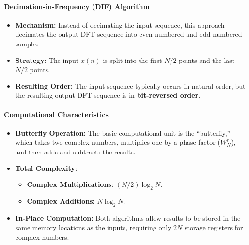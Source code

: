 \hypertarget{decimation-in-frequency-dif-algorithm}{%
\paragraph{Decimation-in-Frequency (DIF)
Algorithm}\label{decimation-in-frequency-dif-algorithm}}

\begin{itemize}
\tightlist
\item
  \textbf{Mechanism:} Instead of decimating the input sequence, this
  approach decimates the output DFT sequence into even-numbered and
  odd-numbered samples.
\item
  \textbf{Strategy:} The input \(x(n)\) is split into the first \(N/2\)
  points and the last \(N/2\) points.
\item
  \textbf{Resulting Order:} The input sequence typically occurs in
  natural order, but the resulting output DFT sequence is in
  \textbf{bit-reversed order}.
\end{itemize}

\hypertarget{computational-characteristics}{%
\paragraph{Computational
Characteristics}\label{computational-characteristics}}

\begin{itemize}
\tightlist
\item
  \textbf{Butterfly Operation:} The basic computational unit is the
  ``butterfly,'' which takes two complex numbers, multiplies one by a
  phase factor (\(W_N^r\)), and then adds and subtracts the results.
\item
  \textbf{Total Complexity:}

  \begin{itemize}
  \tightlist
  \item
    \textbf{Complex Multiplications:} \((N/2) \log_2 N\).
  \item
    \textbf{Complex Additions:} \(N \log_2 N\).
  \end{itemize}
\item
  \textbf{In-Place Computation:} Both algorithms allow results to be
  stored in the same memory locations as the inputs, requiring only
  \(2N\) storage registers for complex numbers.
\end{itemize}

